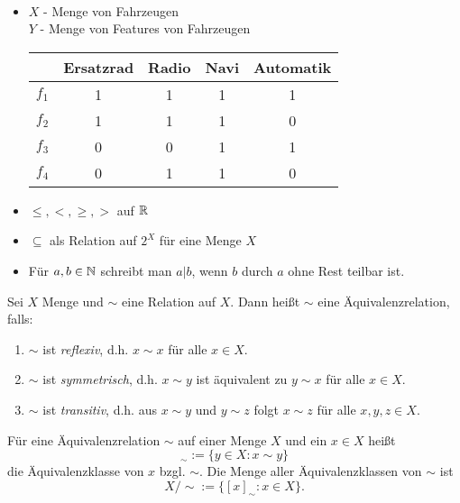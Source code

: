 \begin{bsp}\ %
\begin{itemize}
	\item $ X $ - Menge von Fahrzeugen\\
	$ Y $ - Menge von Features von Fahrzeugen

	\begin{tabular}{l|c|c|c|c}
		& Ersatzrad & Radio & Navi & Automatik \\
		\hline
		$ f_1 $ & 1 & 1 & 1 & 1 \\
		$ f_2 $ & 1 & 1 & 1 & 0 \\
		$ f_3 $ & 0 & 0 & 1 & 1 \\
		$ f_4 $ & 0 & 1 & 1 & 0
	\end{tabular}
	\item $ \leq, <, \geq, > $ auf $ \mathbb{R} $
	\item $ \subseteq $ als Relation auf $ 2^X $ für eine Menge $ X $
	\item Für $ a,b \in \mathbb{N} $ schreibt man $ a | b $, wenn $ b $ durch $ a $ ohne Rest teilbar ist.
\end{itemize}
\end{bsp}


\begin{defn}
Sei $ X $ Menge und $ \sim $ eine Relation auf $ X $. Dann heißt $ \sim $ eine Äquivalenzrelation, falls:
\begin{enumerate}
	\item $ \sim $ ist \emph{reflexiv}, d.h. $ x \sim x $ für alle $ x \in X $.
	\item $ \sim $ ist \emph{symmetrisch}, d.h. $ x \sim y $ ist äquivalent zu $ y \sim x $ für alle $ x \in X $.
	\item $ \sim $ ist \emph{transitiv}, d.h. aus $ x \sim y $ und $ y \sim z $ folgt $ x \sim z $ für alle $ x,y,z \in X $.
\end{enumerate}
Für eine Äquivalenzrelation $ \sim $ auf einer Menge $ X $ und ein $ x \in X $ heißt
\begin{equation*}
	[x]_\sim := \{ y \in X : x \sim y \}
\end{equation*}
die Äquivalenzklasse von $ x $ bzgl. $ \sim $. Die Menge aller Äquivalenzklassen von $ \sim $ ist
\begin{equation*}
	X/{\sim} := \{ [x]_\sim : x \in X \}. %
\end{equation*}
\end{defn} 


